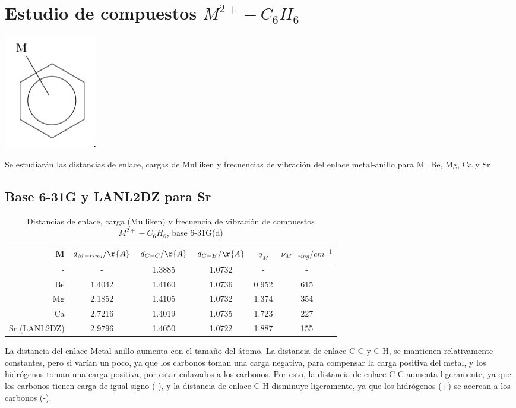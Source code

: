 \documentclass[12pt]{article}
\begin{document}
\section{Estudio de compuestos $M^{2+}-C_6H_6$}
\begin{center}
    \includegraphics[height=0.20\textwidth]{MBenzene.png}
\end{center}

Se estudiarán las distancias de enlace, cargas de Mulliken y frecuencias de vibración del enlace metal-anillo para M=Be, Mg, Ca y Sr

\subsection{Base 6-31G y LANL2DZ para Sr}

\begin{table}[H]
    \centering
    \begin{tabular}{rccccc}
        \hline
        M  & $d_{M-ring}/\r{A}$ & $d_{C-C}/\r{A}$ & $d_{C-H}/\r{A}$ & $q_{M}$ & $\nu_{M-ring}/cm^{-1}$ \\
        \hline
        -  & -               & 1.3885          & 1.0732          & -       & -               \\
        Be & 1.4042          & 1.4160          & 1.0736          & 0.952   & 615             \\
        Mg & 2.1852          & 1.4105          & 1.0732          & 1.374   & 354              \\
        Ca & 2.7216          & 1.4019          & 1.0735          & 1.723   & 227              \\
        Sr (LANL2DZ) & 2.9796          & 1.4050          & 1.0722          & 1.887   & 155              \\
        \hline
    \end{tabular}
    \caption{Distancias de enlace, carga (Mulliken) y frecuencia de vibración de compuestos $M^{2+}-C_6H_6$, base 6-31G(d)}
\end{table}

La distancia del enlace Metal-anillo aumenta con el tamaño del átomo.
La distancia de enlace C-C y C-H, se mantienen relativamente constantes, pero si varían un poco, ya que los carbonos toman una carga negativa, para compensar la carga positiva del metal, y los hidrógenos toman una carga positiva, por estar enlazados a los carbonos. Por esto, la distancia de enlace C-C aumenta ligeramente, ya que los carbonos tienen carga de igual signo (-), y la distancia de enlace C-H disminuye ligeramente, ya que los hidrógenos (+) se acercan a los carbonos (-).
\end{document}
